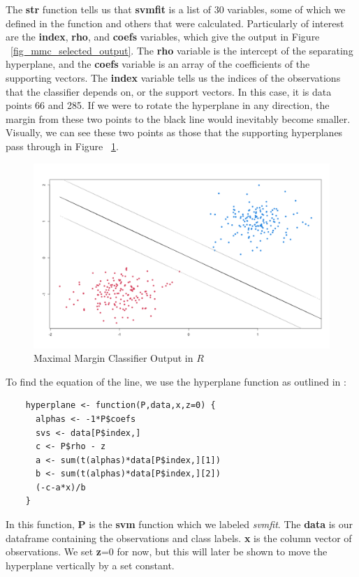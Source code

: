 \documentclass[12pt]{article}
\begin{document}
The \textbf{str} function tells us that \textbf{svmfit} is a list of 30 variables, some of which we defined in the function and others that were calculated. Particularly of interest are the \textbf{index}, \textbf{rho}, and \textbf{coefs} variables, which give the output in Figure ~\ref{fig_mmc_selected_output}. The \textbf{rho} variable is the intercept of the separating hyperplane, and the \textbf{coefs} variable is an array of the coefficients of the supporting vectors. The \textbf{index} variable tells us the indices of the observations that the classifier depends on, or the support vectors. In this case, it is data points 66 and 285. If we were to rotate the hyperplane in any direction, the margin from these two points to the black line would inevitably become smaller. Visually, we can see these two points as those that the supporting hyperplanes pass through in Figure ~\ref{fig_mmc_graph}.

\begin{figure}[H]
    \centering
    \includegraphics[width=5in]{Figures/mmc/mmc_graph.png}
    \caption{Maximal Margin Classifier Output in $R$}
    \label{fig_mmc_graph}
\end{figure}

To find the equation of the line, we use the hyperplane function as outlined in \cite{teitelbaum2021svm}:
\begin{verbatim}
    hyperplane <- function(P,data,x,z=0) {
      alphas <- -1*P$coefs
      svs <- data[P$index,]
      c <- P$rho - z
      a <- sum(t(alphas)*data[P$index,][1])
      b <- sum(t(alphas)*data[P$index,][2])
      (-c-a*x)/b
    }
\end{verbatim}
In this function, \textbf{P} is the \textbf{svm} function which we labeled \textit{svmfit}. The \textbf{data} is our dataframe containing the observations and class labels. \textbf{x} is the column vector of observations. We set \textbf{z}=0 for now, but this will later be shown to move the hyperplane vertically by a set constant. 
\end{document}
